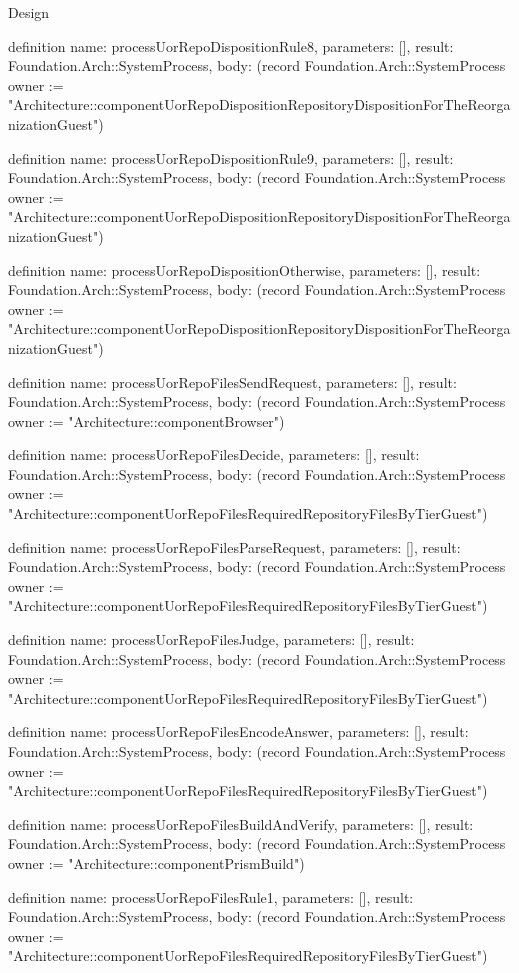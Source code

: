 \begin{lexlean}{Design}
\begin{semanticmodule}
definition{
  name: processUorRepoDispositionRule8,
  parameters: [],
  result: Foundation.Arch::SystemProcess,
  body: (record Foundation.Arch::SystemProcess {owner := "Architecture::componentUorRepoDispositionRepositoryDispositionForTheReorganizationGuest"})
}

definition{
  name: processUorRepoDispositionRule9,
  parameters: [],
  result: Foundation.Arch::SystemProcess,
  body: (record Foundation.Arch::SystemProcess {owner := "Architecture::componentUorRepoDispositionRepositoryDispositionForTheReorganizationGuest"})
}

definition{
  name: processUorRepoDispositionOtherwise,
  parameters: [],
  result: Foundation.Arch::SystemProcess,
  body: (record Foundation.Arch::SystemProcess {owner := "Architecture::componentUorRepoDispositionRepositoryDispositionForTheReorganizationGuest"})
}

definition{
  name: processUorRepoFilesSendRequest,
  parameters: [],
  result: Foundation.Arch::SystemProcess,
  body: (record Foundation.Arch::SystemProcess {owner := "Architecture::componentBrowser"})
}

definition{
  name: processUorRepoFilesDecide,
  parameters: [],
  result: Foundation.Arch::SystemProcess,
  body: (record Foundation.Arch::SystemProcess {owner := "Architecture::componentUorRepoFilesRequiredRepositoryFilesByTierGuest"})
}

definition{
  name: processUorRepoFilesParseRequest,
  parameters: [],
  result: Foundation.Arch::SystemProcess,
  body: (record Foundation.Arch::SystemProcess {owner := "Architecture::componentUorRepoFilesRequiredRepositoryFilesByTierGuest"})
}

definition{
  name: processUorRepoFilesJudge,
  parameters: [],
  result: Foundation.Arch::SystemProcess,
  body: (record Foundation.Arch::SystemProcess {owner := "Architecture::componentUorRepoFilesRequiredRepositoryFilesByTierGuest"})
}

definition{
  name: processUorRepoFilesEncodeAnswer,
  parameters: [],
  result: Foundation.Arch::SystemProcess,
  body: (record Foundation.Arch::SystemProcess {owner := "Architecture::componentUorRepoFilesRequiredRepositoryFilesByTierGuest"})
}

definition{
  name: processUorRepoFilesBuildAndVerify,
  parameters: [],
  result: Foundation.Arch::SystemProcess,
  body: (record Foundation.Arch::SystemProcess {owner := "Architecture::componentPrismBuild"})
}

definition{
  name: processUorRepoFilesRule1,
  parameters: [],
  result: Foundation.Arch::SystemProcess,
  body: (record Foundation.Arch::SystemProcess {owner := "Architecture::componentUorRepoFilesRequiredRepositoryFilesByTierGuest"})
}


\end{semanticmodule}
\end{lexlean}
